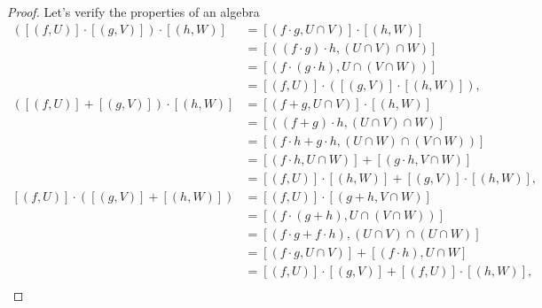 \begin{proof}
    Let's verify the properties of an algebra
    \begingroup
    \allowdisplaybreaks%
    \begin{align*}
        \left([(f, U)] \cdot [(g, V)]\right) \cdot [(h, W)] & = [(f \cdot g, U \cap V)]\cdot [(h, W)]                                       \\
                                                            & = [((f \cdot g)\cdot h, (U \cap V) \cap W)]                                   \\
                                                            & = [(f \cdot (g \cdot h), U \cap (V \cap W))]                                  \\
                                                            & = [(f, U)]\cdot \left([(g, V)]\cdot [(h, W)]\right),                          \\
        ([(f, U)] + [(g, V)])\cdot [(h, W)]                 & = [(f + g, U\cap V)]\cdot [(h, W)]                                            \\
                                                            & = [((f + g)\cdot h, (U\cap V) \cap W)]                                        \\
                                                            & = [(f\cdot h + g\cdot h, (U\cap W) \cap (V\cap W))]                           \\
                                                            & = [(f\cdot h, U\cap W)] + [(g\cdot h, V\cap W)]                               \\
                                                            & = [(f, U)]\cdot [(h, W)] + [(g, V)]\cdot [(h, W)],                            \\
        [(f, U)]\cdot ([(g, V)] + [(h, W)])                 & = [(f, U)]\cdot [(g + h, V\cap W)]                                            \\
                                                            & = [(f\cdot (g + h), U\cap (V\cap W))]                                         \\
                                                            & = [(f\cdot g + f\cdot h), (U\cap V) \cap (U\cap W)]                           \\
                                                            & = [(f\cdot g, U\cap V)] + [(f\cdot h), U\cap W]                               \\
                                                            & = [(f, U)]\cdot [(g, V)] + [(f, U)]\cdot [(h, W)],                            \\

\end{align*}
\end{proof}
